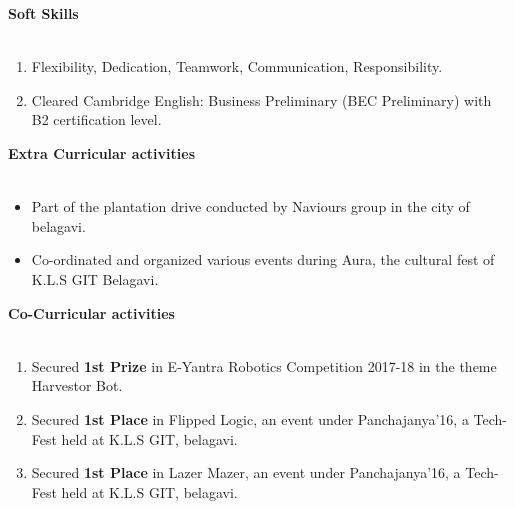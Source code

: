 \documentclass[15pt]{article}
\begin{document}
\vspace{1mm}
\begin{flushleft}
	{\textbf{Soft Skills}} \\
	\vspace{0.5mm}
	\noindent \hrulefill 
	\vspace{0.5mm} \\
	\begin{enumerate}
		\item Flexibility, Dedication, Teamwork, Communication, Responsibility.
		\item Cleared Cambridge English: Business Preliminary (BEC Preliminary) with B2 certification level.
	\end{enumerate}
\end{flushleft}
\vspace{1mm}
\begin{flushleft}
	{\textbf{Extra Curricular activities}} \\
	\vspace{0.5mm}
	\noindent \hrulefill 
	\vspace{0.5mm} \\
	\begin{itemize}
		\item Part of the plantation drive conducted by Naviours group in the city of belagavi.
		\item Co-ordinated and organized various events during Aura, the cultural fest of K.L.S GIT Belagavi.
	\end{itemize}
\end{flushleft}
\vspace{1mm}
\begin{flushleft}
	{\textbf{Co-Curricular activities}} \\
	\vspace{0.5mm}
	\noindent \hrulefill 
	\vspace{0.5mm} \\
	\begin{enumerate}
		\item Secured \textbf{1st Prize} in E-Yantra Robotics Competition 2017-18 in the theme Harvestor Bot.
		\item Secured \textbf{1st Place} in Flipped Logic, an event under Panchajanya'16, a Tech-Fest held at K.L.S GIT, belagavi.
		\item Secured \textbf{1st Place} in Lazer Mazer, an event under Panchajanya'16, a Tech-Fest held at K.L.S GIT, belagavi.
	\end{enumerate}
\end{flushleft}
\end{document}
